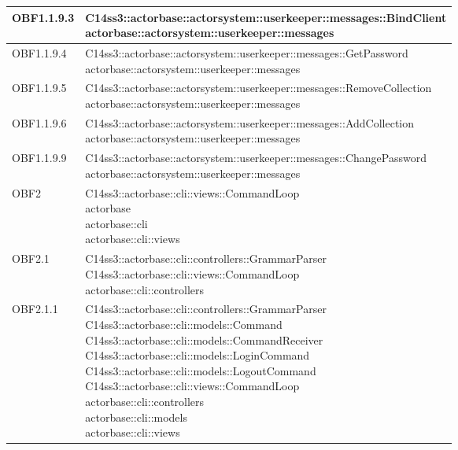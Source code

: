 \documentclass{scalatekids-article}
\begin{document}
\begin{longtable}[H]{|p{4.5cm}|p{13cm}|}
\hline
OBF1.1.9.3 & \multiLineCell[t]{C14ss3::actorbase::actorsystem::userkeeper::messages::BindClient\\actorbase::actorsystem::userkeeper::messages\\}\\
\hline
OBF1.1.9.4 & \multiLineCell[t]{C14ss3::actorbase::actorsystem::userkeeper::messages::GetPassword\\actorbase::actorsystem::userkeeper::messages\\}\\
\hline
OBF1.1.9.5 & \multiLineCell[t]{C14ss3::actorbase::actorsystem::userkeeper::messages::RemoveCollection\\actorbase::actorsystem::userkeeper::messages\\}\\
\hline
OBF1.1.9.6 & \multiLineCell[t]{C14ss3::actorbase::actorsystem::userkeeper::messages::AddCollection\\actorbase::actorsystem::userkeeper::messages\\}\\
\hline
OBF1.1.9.9 & \multiLineCell[t]{C14ss3::actorbase::actorsystem::userkeeper::messages::ChangePassword\\actorbase::actorsystem::userkeeper::messages\\}\\
\hline
OBF2 & \multiLineCell[t]{C14ss3::actorbase::cli::views::CommandLoop\\actorbase\\actorbase::cli\\actorbase::cli::views\\}\\
\hline
OBF2.1 & \multiLineCell[t]{C14ss3::actorbase::cli::controllers::GrammarParser\\C14ss3::actorbase::cli::views::CommandLoop\\actorbase::cli::controllers\\}\\
\hline
OBF2.1.1 & \multiLineCell[t]{C14ss3::actorbase::cli::controllers::GrammarParser\\C14ss3::actorbase::cli::models::Command\\C14ss3::actorbase::cli::models::CommandReceiver\\C14ss3::actorbase::cli::models::LoginCommand\\C14ss3::actorbase::cli::models::LogoutCommand\\C14ss3::actorbase::cli::views::CommandLoop\\actorbase::cli::controllers\\actorbase::cli::models\\actorbase::cli::views\\}\\

\end{longtable}
\end{document}
